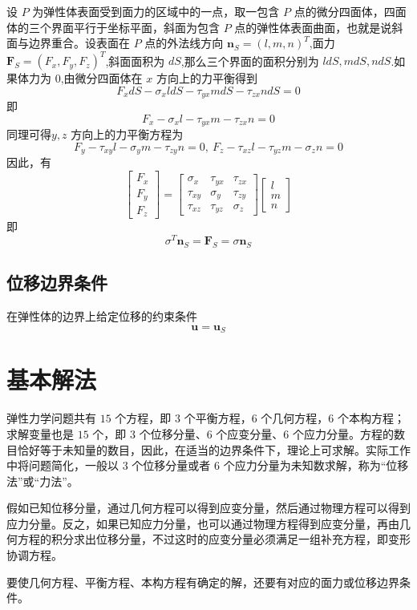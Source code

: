 \documentclass[12pt,a4paper]{article}
\begin{document}
设 $P$ 为弹性体表面受到面力的区域中的一点，取一包含 $P$ 点的微分四面体，四面体的三个界面平行于坐标平面，斜面为包含 $P$ 点的弹性体表面曲面，也就是说斜面与边界重合。设表面在 $P$ 点的外法线方向 $\textbf{n}_S=(l,m,n)^T$,面力 $\textbf{F}_S=(F_x,F_y,F_z)^T$,斜面面积为 $dS$,那么三个界面的面积分别为 $ldS,mdS,ndS$.如果体力为 $0$,由微分四面体在 $x$ 方向上的力平衡得到
$$
F_xdS-\sigma_xldS-\tau_{yx}mdS-\tau_{zx}ndS=0
$$
即
$$
F_x-\sigma_xl-\tau_{yx}m-\tau_{zx}n=0
$$
同理可得$y,z$ 方向上的力平衡方程为
$$
F_y-\tau_{xy}l-\sigma_{y}m-\tau_{zy}n=0, ~ F_z-\tau_{xz}l-\tau_{yz}m-\sigma_{z}n=0
$$
因此，有
$$
\begin{bmatrix}
F_x \\
F_y \\
F_z
\end{bmatrix}=
\begin{bmatrix}
\sigma _x & \tau_{yx} & \tau_{zx} \\
\tau_{xy} & \sigma _y & \tau_{zy} \\
\tau_{xz} & \tau_{yz} & \sigma _z
\end{bmatrix}
\begin{bmatrix}
l \\
m \\
n
\end{bmatrix}
$$
即
$$
\sigma ^T\textbf{n}_S=\textbf{F}_S=\sigma\textbf{n}_S
$$

\subsection{位移边界条件}
在弹性体的边界上给定位移的约束条件
$$
\textbf{u}=\textbf{u}_S
$$

\section{基本解法}

弹性力学问题共有 $15$ 个方程，即 $3$ 个平衡方程，$6$ 个几何方程，$6$ 个本构方程；求解变量也是 $15$ 个，即 $3$ 个位移分量、$6$ 个应变分量、$6$ 个应力分量。方程的数目恰好等于未知量的数目，因此，在适当的边界条件下，理论上可求解。实际工作中将问题简化，一般以 $3$ 个位移分量或者 $6$ 个应力分量为未知数求解，称为“位移法”或“力法”。

假如已知位移分量，通过几何方程可以得到应变分量，然后通过物理方程可以得到应力分量。反之，如果已知应力分量，也可以通过物理方程得到应变分量，再由几何方程的积分求出位移分量，不过这时的应变分量必须满足一组补充方程，即变形协调方程。

要使几何方程、平衡方程、本构方程有确定的解，还要有对应的面力或位移边界条件。
\end{document}
